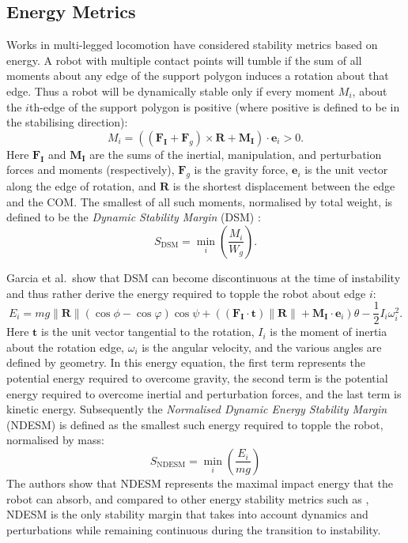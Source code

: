 \documentclass[12pt,a4paper,twoside]{article}
\newcommand{\vvc}[1]{{\bm{#1}}}
\begin{document}
\subsection{Energy Metrics}
Works in multi-legged locomotion have considered stability metrics based on energy. A robot with multiple contact points will tumble if the sum of all moments about any edge of the support polygon induces a rotation about that edge. Thus a robot will be dynamically stable only if every moment $M_i$, about the $i$th-edge of the support polygon is positive (where positive is defined to be in the stabilising direction): 
\begin{equation}
M_i = \left((\vvc{F}_\vvc{I}+\vvc{F}_{g}) \times \vvc{R} + \vvc{M}_\vvc{I} \right) \cdot \vvc{e}_i > 0.
\end{equation}
Here $\vvc{F}_\vvc{I}$ and $ \vvc{M}_\vvc{I}$ are the sums of the inertial, manipulation, and perturbation forces and moments (respectively), $\vvc{F}_{g}$ is the gravity force, $\vvc{e}_i$ is the unit vector along the edge of rotation, and $\vvc{R}$ is the shortest displacement between the edge and the COM. The smallest of all such moments, normalised by total weight, is defined to be the \emph{Dynamic Stability Margin} (DSM) \cite{Lin2001}:
\begin{equation}
S_\text{DSM} = \min_i\left(\frac{ M_i}{ W_g} \right).
\end{equation}

Garcia et al.\ show that DSM can become discontinuous at the time of instability \cite{Garcia2005} and thus rather derive the energy required to topple the robot about edge $i$:
\begin{equation}
E_i = mg\|\vvc{R}\|(\cos \phi - \cos \varphi)\cos \psi + \left((\vvc{F}_\vvc{I} \cdot \vvc{t}) \|\vvc{R}\|+\vvc{M}_\vvc{I}\cdot\vvc{e}_i\right)\theta - \frac{1}{2}I_i\omega^2_i.
\end{equation}
Here $\vvc{t}$ is the unit vector tangential to the rotation, $I_i$ is the moment of inertia about the rotation edge, $\omega_i$ is the angular velocity, and the various angles are defined by geometry. In this energy equation, the first term represents the potential energy required to overcome gravity, the second term is the potential energy required to overcome inertial and perturbation forces, and the last term is kinetic energy. Subsequently the \emph{Normalised Dynamic Energy Stability Margin} (NDESM) \cite{Garcia2006} is defined as the smallest such energy required to topple the robot, normalised by mass:
\begin{equation}
S_\text{NDESM} = \min_i \left( \frac{E_i}{mg} \right)
\end{equation}
The authors show that NDESM represents the maximal impact energy that the robot can absorb, and compared to other energy stability metrics such as \cite{Messuri1985,Papadopoulos1996, Hirose2001}, NDESM is the only stability margin that takes into account dynamics and perturbations while remaining continuous during the transition to instability.  





\end{document}
